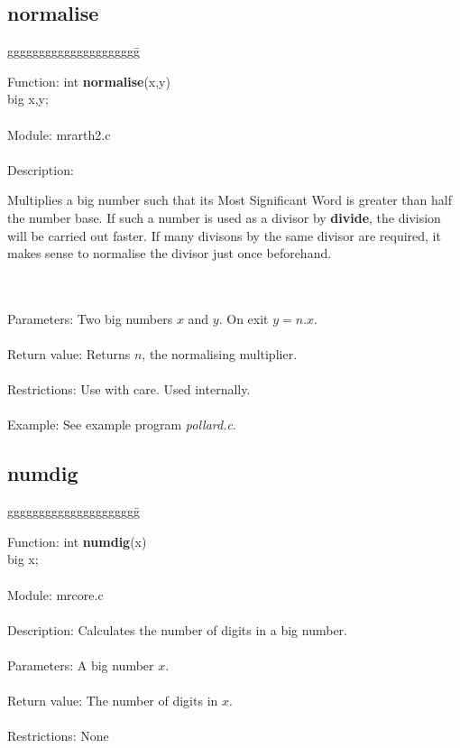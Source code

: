\subsection{normalise}
\begin{tabbing}
ggggggggggggggggggggg\= \kill

      Function:      \>int {\bf normalise}(x,y) \\
                     \>big x,y; \\
      \ \\
      Module:        \>mrarth2.c \\
      \ \\
      Description:   \>
                     \parbox[t]{3 in}
                     {Multiplies a big number such that its Most Significant
                     Word is greater than half the number base. If such a
                     number is used as a divisor by {\bf divide}, the 
                     division will be carried out faster. If many divisons
                     by the same divisor are required, it makes sense to
                     normalise the divisor just once beforehand.}\\
      \ \\
      Parameters:    \>Two big numbers $x$ and $y$. On exit $y=n.x$. \\
      \ \\
      Return value:  \>Returns $n$, the normalising multiplier. \\
      \ \\
      Restrictions:  \>Use with care. Used internally.\\
      \ \\
      Example:       \>See example program {\em pollard.c}.  \\

\end{tabbing}

\subsection{numdig}

\begin{tabbing}
ggggggggggggggggggggg\= \kill

      Function:      \>int {\bf numdig}(x) \\
                     \>big x; \\
      \ \\
      Module:        \>mrcore.c \\
      \ \\
      Description:   \>Calculates the number of digits in a big number. \\
      \ \\
      Parameters:    \>A big number $x$. \\
      \ \\
      Return value:  \>The number of digits in $x$. \\
      \ \\
      Restrictions:  \>None \\


\end{tabbing}


